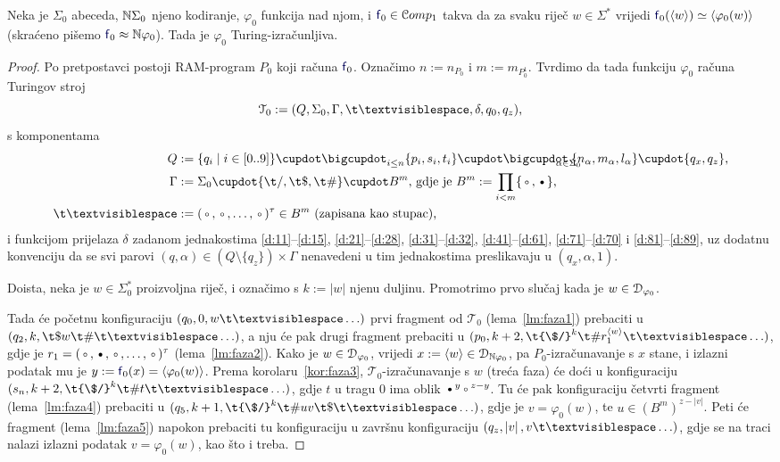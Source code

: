 \begin{teorem}\label{tm:krit}
Neka je $\Sigma_0$ abeceda, ${\mathbb N}\Sigma_0$ njeno kodiranje, $\varphi_0$ funkcija nad njom, i $\f f_0\in\mathcal Comp_1$ takva da za svaku riječ $w\in\Sigma^*$ vrijedi $\f f_0(\kr{w})\simeq\kr{\varphi_0(w)}$ (skraćeno pišemo $\f f_0\approx\N\varphi_0$). Tada je $\varphi_0$ Turing-izračunljiva.
\end{teorem}
\begin{proof}
Po pretpostavci postoji RAM-program $P_0$ koji računa $\f f_0$. Označimo $n:=n_{P_0}$ i $m:=m_{P_0^1}$. Tvrdimo da tada funkciju $\varphi_0$ računa Turingov stroj
\begin{equation}
    \mathcal T_0:=(Q,\Sigma_0,\Gamma,\bl,\delta,q_0,q_z)\text,
\end{equation}
s komponentama
\begin{align}
    Q&:=\{q_i\mid i\in[0..9]\}\dcup\bdcup_{i\le n}\{p_i,s_i,t_i\}\dcup\bdcup_{\mathclap{\alpha\in\Sigma_0}}\,\{n_\alpha,m_\alpha,l_\alpha\}\dcup\{q_x,q_z\}\text,\\
    \Gamma&:=    \Sigma_0\dcup\{\t/,\t\$,\t\#\}\dcup B^m\text{, gdje je }B^m:=\prod_{i<m}\{\text\textopenbullet,\text\textbullet\}\text,\\
    \bl&:=(\text\textopenbullet,\text\textopenbullet,\dotsc,\text\textopenbullet)^\tau\in B^m\text{ (zapisana kao stupac),}
\end{align}
i funkcijom prijelaza $\delta$ zadanom jednakostima \eqref{d:11}--\eqref{d:15}, \eqref{d:21}--\eqref{d:28}, \eqref{d:31}--\eqref{d:32}, \eqref{d:41}--\eqref{d:61},
\eqref{d:71}--\eqref{d:70} i
\eqref{d:81}--\eqref{d:89}, uz dodatnu konvenciju da se svi parovi $(q,\alpha)\in(Q\setminus\{q_z\})\times\Gamma$ nenavedeni u tim jednakostima preslikavaju u $(q_x,\alpha,1)$.

Doista, neka je $w\in\Sigma_0^*$ proizvoljna riječ, i označimo s $k:=\left|w\right|$ njenu duljinu. Promotrimo prvo slučaj kada je $w\in\mathcal D_{\varphi_0}$.

Tada će početnu konfiguraciju $(q_0,0,w\bl\ldots)$ prvi fragment od $\mathcal T_0$ (lema~\ref{lm:faza1}) prebaciti u $(q_2,k,\t\$w\t\#\bl\ldots)$, a nju će pak drugi fragment prebaciti u $(p_0,k+2,\t{\$/}^k\t\#r_1^{\kr w}\bl\ldots)$, gdje je $r_1=(\text\textopenbullet,\text\textbullet,\text\textopenbullet,\dotsc,\text\textopenbullet)^\tau$ (lema~\ref{lm:faza2}). Kako je $w\in\mathcal D_{\varphi_0}$, vrijedi $x:=\langle w\rangle\in\mathcal D_{{\mathbb N}\varphi_0}$, pa $P_0$-izračunavanje s $x$ stane, i izlazni podatak mu je $y:=\f f_0(x)=\kr{\varphi_0(w)}$. Prema korolaru~\ref{kor:faza3}, $\mathcal T_0$-izračunavanje s $w$ (treća faza) će doći u konfiguraciju $(s_n,k+2,\t{\$/}^k\t\#t\bl\ldots)$, gdje $t$ u tragu $0$ ima oblik $\textup\textbullet^y\textup\textopenbullet^{z-y}$. Tu će pak konfiguraciju četvrti fragment (lema~\ref{lm:faza4}) prebaciti u $(q_5,k+1,\t{\$/}^k\t\#uv\t\$\bl\ldots)$, gdje je $v=\varphi_0(w)$, te $u\in(B^m)^{z-\left|v\right|}$. Peti će fragment (lema~\ref{lm:faza5}) napokon prebaciti tu konfiguraciju u završnu konfiguraciju $(q_z,\left|v\right|,v\bl\ldots)$, gdje se na traci nalazi izlazni podatak $v=\varphi_0(w)$, kao što i treba.


\end{proof}
